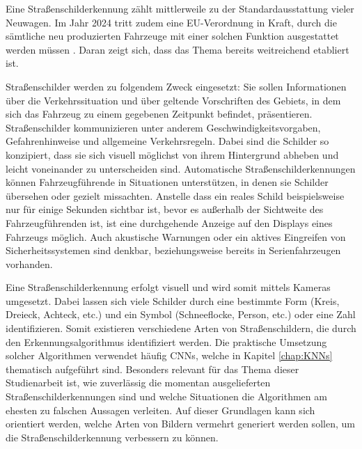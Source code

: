 \label{chap:stand-der-technik-strassenschilderkennung}
Eine Straßenschilderkennung zählt mittlerweile zu der Standardausstattung vieler Neuwagen. Im Jahr 2024 tritt zudem eine EU-Verordnung in Kraft, durch die sämtliche neu produzierten Fahrzeuge mit einer solchen Funktion ausgestattet werden müssen \cite{eu-regulation}. Daran zeigt sich, dass das Thema bereits weitreichend etabliert ist.

Straßenschilder werden zu folgendem Zweck eingesetzt: Sie sollen Informationen über die Verkehrssituation und über geltende Vorschriften des Gebiets, in dem sich das Fahrzeug zu einem gegebenen Zeitpunkt befindet, präsentieren. Straßenschilder kommunizieren unter anderem Geschwindigkeitsvorgaben, Gefahrenhinweise und allgemeine Verkehrsregeln. Dabei sind die Schilder so konzipiert, dass sie sich visuell möglichst von ihrem Hintergrund abheben und leicht voneinander zu unterscheiden sind. Automatische Straßenschilderkennungen können Fahrzeugführende in Situationen unterstützen, in denen sie Schilder übersehen oder gezielt missachten. Anstelle dass ein reales Schild beispielsweise nur für einige Sekunden sichtbar ist, bevor es außerhalb der Sichtweite des Fahrzeugführenden ist, ist eine durchgehende Anzeige auf den Displays eines Fahrzeugs möglich. Auch akustische Warnungen oder ein aktives Eingreifen von Sicherheitssystemen sind denkbar, beziehungsweise bereits in Serienfahrzeugen vorhanden. \cite{traffic-sign-detection-review-2014}

Eine Straßenschilderkennung erfolgt visuell und wird somit mittels Kameras umgesetzt. Dabei lassen sich viele Schilder durch eine bestimmte Form (Kreis, Dreieck, Achteck, etc.) und ein Symbol (Schneeflocke, Person, etc.) oder eine Zahl identifizieren. Somit existieren verschiedene Arten von Straßenschildern, die durch den Erkennungsalgorithmus identifiziert werden. Die praktische Umsetzung solcher Algorithmen verwendet häufig \acp{CNN}, welche in Kapitel \ref{chap:KNNs} thematisch aufgeführt sind. Besonders relevant für das Thema dieser Studienarbeit ist, wie zuverlässig die momentan ausgelieferten Straßenschilderkennungen sind und welche Situationen die Algorithmen am ehesten zu falschen Aussagen verleiten. Auf dieser Grundlagen kann sich orientiert werden, welche Arten von Bildern vermehrt generiert werden sollen, um die Straßenschilderkennung verbessern zu können. \cite{traffic-sign-detection-review-2014}


